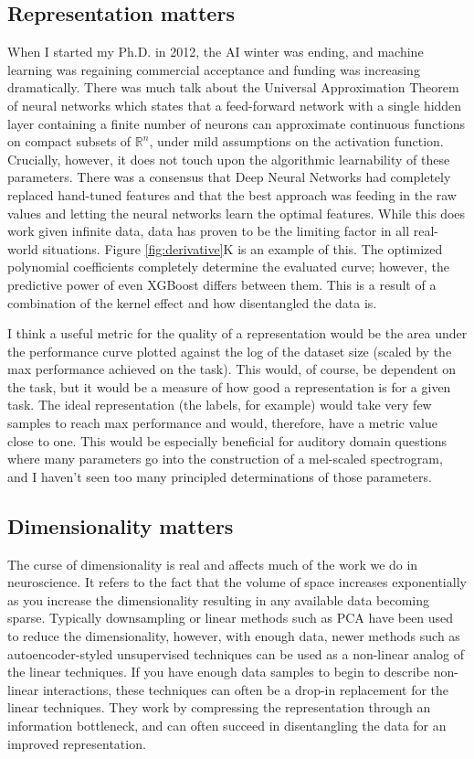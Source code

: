 \subsection{Representation matters}
When I started my Ph.D. in 2012, the AI winter was ending, and machine learning was regaining commercial acceptance and funding was increasing dramatically. There was much talk about the Universal Approximation Theorem of neural networks \cite{csaji2001approximation} which states that a feed-forward network with a single hidden layer containing a finite number of neurons can approximate continuous functions on compact subsets of $\mathbb{R}^n$, under mild assumptions on the activation function. Crucially, however, it does not touch upon the algorithmic learnability of these parameters. There was a consensus that Deep Neural Networks had completely replaced hand-tuned features and that the best approach was feeding in the raw values and letting the neural networks learn the optimal features. While this does work given infinite data, data has proven to be the limiting factor in all real-world situations\cite{halevy2009unreasonable, sun2017revisiting}. Figure \ref{fig:derivative}K is an example of this. The optimized polynomial coefficients completely determine the evaluated \Thielk curve; however, the predictive power of even XGBoost differs between them. This is a result of a combination of the kernel effect and how disentangled the data is. 

I think a useful metric for the quality of a representation would be the area under the performance curve plotted against the log of the dataset size (scaled by the max performance achieved on the task). This would, of course, be dependent on the task, but it would be a measure of how good a representation is for a given task. The ideal representation (the labels, for example) would take very few samples to reach max performance and would, therefore, have a metric value close to one. This would be especially beneficial for auditory domain questions where many parameters go into the construction of a mel-scaled spectrogram, and I haven't seen too many principled determinations of those parameters.

\subsection{Dimensionality matters}
The curse of dimensionality is real and affects much of the work we do in neuroscience. It refers to the fact that the volume of space increases exponentially as you increase the dimensionality resulting in any available data becoming sparse. Typically downsampling or linear methods such as PCA have been used to reduce the dimensionality, however, with enough data, newer methods such as autoencoder-styled unsupervised techniques can be used as a non-linear analog of the linear techniques. If you have enough data samples to begin to describe non-linear interactions, these techniques can often be a drop-in replacement for the linear techniques. They work by compressing the representation through an information bottleneck, and can often succeed in disentangling the data for an improved representation.

